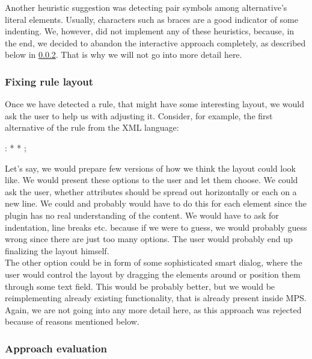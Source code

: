 Another heuristic suggestion was detecting pair symbols among alternative's literal elements.
Usually, characters such as braces are a good indicator of some indenting.
We, however, did not implement any of these heuristics, because, in the end, we decided to abandon the interactive approach completely, as described below in \ref{chap:interactive_approach_evaluation}.
That is why we will not go into more detail here.

\subsubsection{Fixing rule layout}

Once we have detected a rule, that might have some interesting layout, we would ask the user to help us with adjusting it.
Consider, for example, the first alternative of the  rule from the XML language:

\begin{antlr}
	  :   \literal{<}  * \literal{>} * \literal{</}  \literal{>} ;
\end{antlr}

Let's say, we would prepare few versions of how we think the layout could look like.
We would present these options to the user and let them choose.
We could ask the user, whether attributes should be spread out horizontally or each on a new line.
We could and probably would have to do this for each element since the plugin has no real understanding of the content.
We would have to ask for indentation, line breaks etc. because if we were to guess, we would probably guess wrong since there are just too many options.
The user would probably end up finalizing the layout himself.
\\

The other option could be in form of some sophisticated smart dialog, where the user would control the layout by dragging the elements around or position them through some text field.
This would be probably better, but we would be reimplementing already existing functionality, that is already present inside MPS. 
Again, we are not going into any more detail here, as this approach was rejected because of reasons mentioned below.

\subsubsection{Approach evaluation}
\label{chap:interactive_approach_evaluation}

